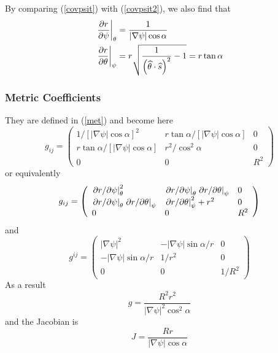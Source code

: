 By comparing (\ref{covpsit}) with (\ref{covpsit2}), we also find that 
\begin{align}
\left. \frac{\partial r}{\partial\psi}\right| _{\theta} & =\frac {1}{\left|
\nabla\psi\right| \cos\alpha} \\
\left. \frac{\partial r}{\partial\theta}\right| _{\psi} & =r\sqrt{\frac {1}{%
\left( \widehat{\theta}\cdot\widehat{s}\right) ^{2}}-1}=r\tan\alpha
\end{align}

\subsubsection{Metric Coefficients}

They are defined in (\ref{met}) and become here 
\begin{equation}
g_{ij}=\left( 
\begin{array}{lll}
1/\left[ \left| \nabla\psi\right| \cos\alpha\right] ^{2} & r\tan \alpha/ 
\left[ \left| \nabla\psi\right| \cos\alpha\right] & 0 \\ 
r\tan\alpha/\left[ \left| \nabla\psi\right| \cos\alpha\right] & 
r^{2}/\cos^{2}\alpha & 0 \\ 
0 & 0 & R^{2}%
\end{array}
\right)  \label{gijpsitheta}
\end{equation}
or equivalently 
\begin{equation}
g_{ij}=\left( 
\begin{array}{lll}
\left. \partial r/\partial\psi\right| _{\theta}^{2} & \left. \partial
r/\partial\psi\right| _{\theta}\left. \partial r/\partial\theta\right|
_{\psi} & 0 \\ 
\left. \partial r/\partial\psi\right| _{\theta}\left. \partial
r/\partial\theta\right| _{\psi} & \left. \partial r/\partial\theta\right|
_{\psi}^{2}+r^{2} & 0 \\ 
0 & 0 & R^{2}%
\end{array}
\right)  \notag
\end{equation}
and 
\begin{equation}
g^{ij}=\left( 
\begin{array}{lll}
\left| \nabla\psi\right| ^{2} & -\left| \nabla\psi\right| \sin\alpha/r & 0
\\ 
-\left| \nabla\psi\right| \sin\alpha/r & 1/r^{2} & 0 \\ 
0 & 0 & 1/R^{2}%
\end{array}
\right)
\end{equation}
As a result 
\begin{equation}
g=\frac{R^{2}r^{2}}{\left| \nabla\psi\right| ^{2}\cos^{2}\alpha}
\end{equation}
and the Jacobian is 
\begin{equation}
J=\frac{Rr}{\left| \nabla\psi\right| \cos\alpha}  \label{jacpsitheta}
\end{equation}


